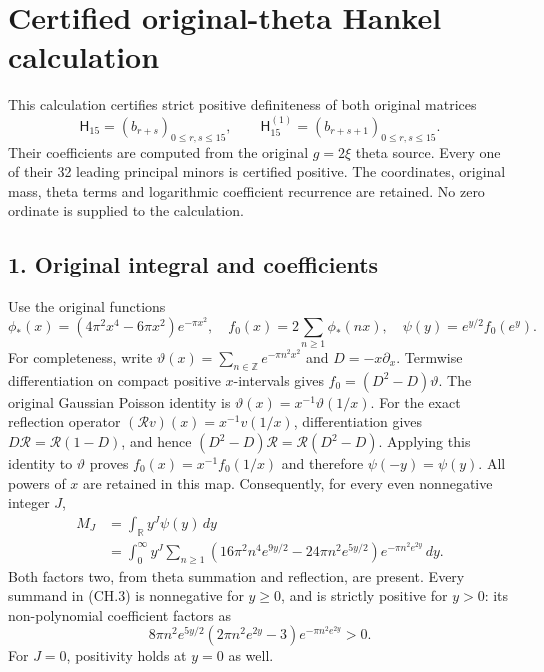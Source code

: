 \section{Certified original-theta Hankel calculation}\label{C47stage:CH:certified-original-theta-hankel-calculation}

This calculation certifies strict positive definiteness of both original matrices \[
 \mathsf H_{15}=(b_{r+s})_{0\le r,s\le15},
 \qquad
 \mathsf H_{15}^{(1)}=(b_{r+s+1})_{0\le r,s\le15}.
\tag{CH.1}
\] Their coefficients are computed from the original \(g=2\xi\) theta source. Every one of their 32 leading principal minors is certified positive. The coordinates, original mass, theta terms and logarithmic coefficient recurrence are retained. No zero ordinate is supplied to the calculation.

\subsection{1. Original integral and coefficients}\label{C47stage:CH:original-integral-and-coefficients}

Use the original functions \[
 \phi_*(x)=(4\pi^2x^4-6\pi x^2)e^{-\pi x^2},\quad
 f_0(x)=2\sum_{n\ge1}\phi_*(nx),\quad
 \psi(y)=e^{y/2}f_0(e^y).
\tag{CH.2}
\] For completeness, write \(\vartheta(x)=\sum_{n\in\mathbb Z}e^{-\pi n^2x^2}\) and \(D=-x\partial_x\). Termwise differentiation on compact positive \(x\)-intervals gives \(f_0=(D^2-D)\vartheta\). The original Gaussian Poisson identity is \(\vartheta(x)=x^{-1}\vartheta(1/x)\). For the exact reflection operator \((\mathcal Rv)(x)=x^{-1}v(1/x)\), differentiation gives \(D\mathcal R=\mathcal R(1-D)\), and hence \((D^2-D)\mathcal R=\mathcal R(D^2-D)\). Applying this identity to \(\vartheta\) proves \(f_0(x)=x^{-1}f_0(1/x)\) and therefore \(\psi(-y)=\psi(y)\). All powers of \(x\) are retained in this map. Consequently, for every even nonnegative integer \(J\), \[
\begin{split}
 M_J&=\int_{\mathbb R}y^J\psi(y)\,dy\\
 &=\int_0^\infty y^J
 \sum_{n\ge1}
 \left(16\pi^2n^4e^{9y/2}-24\pi n^2e^{5y/2}\right)
 e^{-\pi n^2e^{2y}}\,dy .
\end{split}
\tag{CH.3}
\] Both factors two, from theta summation and reflection, are present. Every summand in (CH.3) is nonnegative for \(y\ge0\), and is strictly positive for \(y>0\): its non-polynomial coefficient factors as \[
 8\pi n^2e^{5y/2}
 (2\pi n^2e^{2y}-3)e^{-\pi n^2e^{2y}}>0.
\tag{CH.4}
\] For \(J=0\), positivity holds at \(y=0\) as well.

